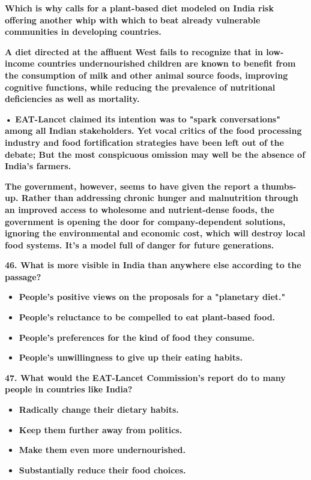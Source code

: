 \documentclass[UTF8,11pt]{ctexart}
\begin{document}
\textbf{Which is why calls for a plant-based diet modeled on India risk offering another whip with which to} \textbf{beat already vulnerable communities in developing countries.}


\textbf{A diet directed at the affluent West fails to recognize that in low-income countries undernourished} \textbf{children are known to benefit from the consumption of milk and other animal source foods, improving} \textbf{cognitive functions, while reducing the prevalence of nutritional deficiencies as well as mortality.}


\textbf{•} \textbf{EAT-Lancet claimed its intention was to "spark conversations" among all Indian stakeholders. Yet} \textbf{vocal critics of the food processing industry and food fortification strategies have been left out of the} \textbf{debate; But the most conspicuous omission may well be the absence of India's farmers.}


\textbf{The government, however, seems to have given the report a thumbs-up. Rather than addressing} \textbf{chronic hunger and malnutrition through an improved access to wholesome and nutrient-dense foods, the} \textbf{government is opening the door for company-dependent solutions, ignoring the environmental and} \textbf{economic cost, which will destroy local food systems. It's a model full of danger for future generations.}


\textbf{46. What is more visible in India than anywhere else according to the passage?}


\begin{itemize}[leftmargin=2em,itemsep=.2em,topsep=.4em]\item[A.] \textbf{People's positive views on the proposals for a "planetary diet."}
\item[B.] \textbf{People's reluctance to be compelled to eat plant-based food.}
\item[C.] \textbf{People's preferences for the kind of food they consume.}
\item[D.] \textbf{People's unwillingness to give up their eating habits.}
\end{itemize}

\textbf{47. What would the EAT-Lancet Commission's report do to many people in countries like India?}


\begin{itemize}[leftmargin=2em,itemsep=.2em,topsep=.4em]\item[A.] \textbf{Radically change their dietary habits.}
\item[B.] \textbf{Keep them further away from politics.}
\item[C.] \textbf{Make them even more undernourished.}
\item[D.] \textbf{Substantially reduce their food choices.}
\end{itemize}
\end{document}
